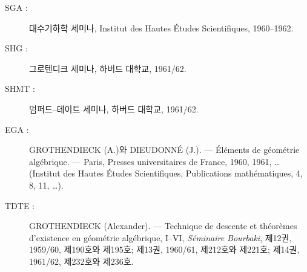 \documentclass[11pt,twoside,openany]{book}
\numberwithin{equation}{section}
\newcommand{\sourceunit}{front}
\newcommand{\src}[1]{%
  \phantomsection\hypertarget{src:\sourceunit:#1}{}%
  \marginpar{\raggedleft\footnotesize\sffamily #1}%
}
\theoremstyle{plain}
\theoremstyle{definition}
\theoremstyle{remark}
\begin{document}
\begin{description}
\item[SGA :] 대수기하학 세미나, Institut des Hautes Études Scientifiques,
1960--1962.

\src{298}
\item[SHG :] 그로텐디크 세미나, 하버드 대학교, 1961/62.

\item[SHMT :] 멈퍼드--테이트 세미나, 하버드 대학교, 1961/62.

\item[EGA :] GROTHENDIECK (A.)와 DIEUDONNÉ (J.). --- Éléments de géométrie
algébrique. --- Paris, Presses universitaires de France, 1960, 1961, …
(Institut des Hautes Études Scientifiques, Publications mathématiques, 4, 8,
11, …).

\item[TDTE :] GROTHENDIECK (Alexander). --- Technique de descente et théorèmes
d'existence en géométrie algébrique, I--VI, \emph{Séminaire Bourbaki}, 제12권,
1959/60, 제190호와 제195호; 제13권, 1960/61, 제212호와 제221호; 제14권,
1961/62, 제232호와 제236호.
\end{description}


\par
\end{document}
